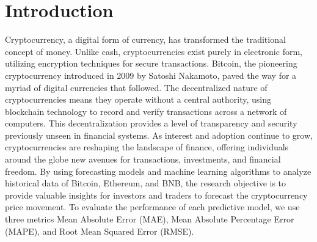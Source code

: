 \documentclass{ieeeojies}
\begin{document}
\section{Introduction}
\label{sec:introduction}
Cryptocurrency, a digital form of currency, has transformed the traditional concept of money. Unlike cash, cryptocurrencies exist purely in electronic form, utilizing encryption techniques for secure transactions. Bitcoin, the pioneering cryptocurrency introduced in 2009 by Satoshi Nakamoto, paved the way for a myriad of digital currencies that followed. The decentralized nature of cryptocurrencies means they operate without a central authority, using blockchain technology to record and verify transactions across a network of computers. This decentralization provides a level of transparency and security previously unseen in financial systems. As interest and adoption continue to grow, cryptocurrencies are reshaping the landscape of finance, offering individuals around the globe new avenues for transactions, investments, and financial freedom. \newline
By using forecasting models and machine learning algorithms to analyze historical data of Bitcoin, Ethereum, and BNB, the research objective is to provide valuable insights for investors and traders to forecast the cryptocurrency price movement. To evaluate the performance of each predictive model, we use three metrics Mean Absolute Error (MAE), Mean Absolute Percentage Error (MAPE), and Root Mean Squared Error (RMSE).
\end{document}
